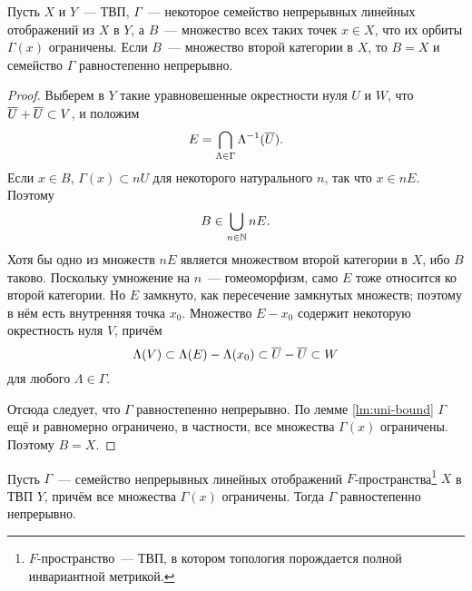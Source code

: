 \documentclass{notes}
\begin{document}
	\begin{thm} \label{thm:ban-stein}
		Пусть $X$ и $Y$~--- ТВП, $\Gamma$~--- некоторое семейство непрерывных линейных отображений из $X$ в $Y$, а $B$~--- множество всех таких точек $x \in X$, что их орбиты $\Gamma(x)$ ограничены. Если $B$~--- множество второй категории в $X$, то $B = X$ и семейство $\Gamma$ равностепенно непрерывно.
		\begin{proof}
			Выберем в $Y$ такие уравновешенные окрестности нуля $U$ и $W$, что $\overline{U} + \overline{U} \subset V$, и положим
			\[
				E = \bigcap\limits_{\Lambda \in \Gamma} \Lambda^{-1}(\overline{U}).
			\]
			Если $x \in B$, $\Gamma(x) \subset nU$ для некоторого натурального $n$, так что $x \in nE$. Поэтому
			\[
				B \in \bigcup\limits_{n \in \mathbb{N}} nE.
			\]
			Хотя бы одно из множеств $nE$ является множеством второй категории в $X$, ибо $B$ таково. Поскольку умножение на $n$~--- гомеоморфизм, само $E$ тоже относится ко второй категории.
			Но $E$ замкнуто, как пересечение замкнутых множеств; поэтому в нём есть внутренняя точка $x_0$. Множество $E - x_0$ содержит некоторую окрестность нуля $V$, причём
			\[
				\Lambda(V) \subset \Lambda(E) - \Lambda(x_0) \subset \overline{U} - \overline{U} \subset W
			\]
			для любого $\Lambda \in \Gamma$. 

			Отсюда следует, что $\Gamma$ равностепенно непрерывно. По лемме \ref{lm:uni-bound} $\Gamma$ ещё и равномерно ограничено, в частности, все множества $\Gamma(x)$ ограничены. Поэтому $B = X$.
		\end{proof}
	\end{thm}

	\begin{cor} \label{cor:ban-stein}
		Пусть $\Gamma$~--- семейство непрерывных линейных отображений $F$-пространства\footnote{$F$-пространство~--- ТВП, в котором топология порождается полной инвариантной метрикой.} $X$ в ТВП $Y$, причём все множества $\Gamma(x)$ ограничены. Тогда $\Gamma$ равностепенно непрерывно.
	\end{cor}
\end{document}
